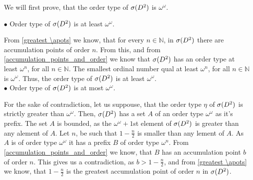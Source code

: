 We will first prove, that the order type of ${{\sigma}(D^2)}$ is $\omega^\omega$.

$\bullet$ Order type of ${{\sigma}(D^2)}$ is at least $\omega^\omega$.

From \ref{greatest \apots} we know, that for every $n\in \mathbb{N}$, in ${{\sigma}(D^2)}$ there are 
accumulation points of order $n$. From this, and from \ref{accumulation_points_and_order} 
we know that ${{\sigma}(D^2)}$ has an order type at least $\omega^n$, for all $n\in \mathbb{N}$. 
The smallest ordinal number qual at least $\omega^n$, for all $n \in \mathbb{N}$ is 
$\omega^\omega$. Thus, the order type of ${{\sigma}(D^2)}$ is at least $\omega^\omega$.\\

$\bullet$ Order type of ${{\sigma}(D^2)}$ is at most $\omega^\omega$.

For the sake of contradiction, let us suppouse, that the order type $\eta$ of ${{\sigma}(D^2)}$ is 
strictly greater than $\omega^\omega$. Then, ${{\sigma}(D^2)}$ has a set $A$ of an order type 
$\omega^\omega$ as it's prefix. The set $A$ is bounded, as the $\omega^\omega+1$st element of 
${{\sigma}(D^2)}$ is greater than any alement of $A$. 
Let $n$, be such that $1-\frac{n}{2}$ is smaller than any lement of $A$. 
As $A$ is of order type $\omega^\omega$ it has a prefix $B$ of order type $\omega^n$.
From \ref{accumulation_points_and_order} we know, that $B$ has an accumulation point $b$ 
of order $n$. This gives us a contradiction, as $b > 1-\frac{n}{2}$, and from \ref{greatest \apots} 
we know, that $1-\frac{n}{2}$ is the greatest accumulation point of order $n$ in ${{\sigma}(D^2)}$. \\

%
%


